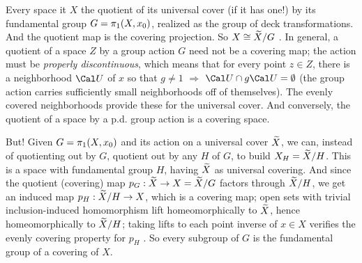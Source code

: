 \bsk


Every space it $X$ the quotient of its universal cover (if it has
one!) by its fundamental group $G=\pi_1(X,x_0)$, realized as the group
of deck transformations. And the quotient map is the covering 
projection. 
So $X\cong \widetilde{X}/G$ . In general, a quotient of a 
space $Z$ by a group action $G$ 
need not be 
a covering map; the action must be {\it properly discontinuous}, 
which means that for every point 
 $z\in Z$, there is a neighborhood ${\Cal U}$ of $x$ so that $g\neq 1$ $\Rightarrow$
${\Cal U}\cap g{\Cal U}=\emptyset$ (the group action carries sufficiently
small neighborhoods off of themselves). The evenly covered neighborhoods
provide these for the universal cover. And conversely, the quotient of a space by a 
p.d. group action is a covering space. 

\msk

But! Given $G=\pi_1(X,x_0)$ and its 
action on a universal cover $\widetilde{X}$, we can, instead of quotienting out by $G$,
quotient out by any  $H$ of $G$, to build $X_H=\widetilde{X}/H$. 
This is a space with fundamental group $H$, having $\widetilde{X}$ as universal covering.
And since the quotient (covering) map $p_G:\widetilde{X}\rightarrow X=\widetilde{X}/G$ factors through $\widetilde{X}/H$,
we get an induced map $p_H:\widetilde{X}/H\rightarrow X$, which is a covering map; open sets with
trivial inclusion-induced homomorphism lift homeomorphically to $\widetilde{X}$,
hence homeomorphically to $\widetilde{X}/H$; taking lifts to each point inverse of $x\in X$
verifies the evenly covering property for $p_H$ . So every subgroup of $G$ is the
fundamental group of a covering of $X$. 

\ssk


